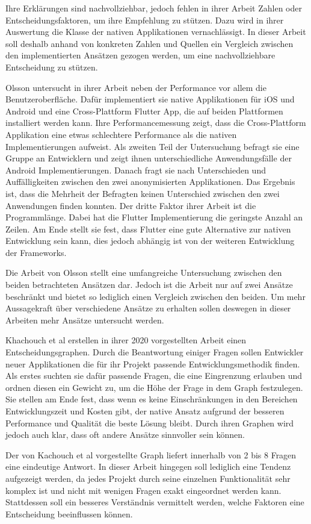 Ihre Erklärungen sind nachvollziehbar, jedoch fehlen in ihrer Arbeit Zahlen oder Entscheidungsfaktoren, um ihre Empfehlung zu stützen. Dazu wird in ihrer Auswertung die Klasse der nativen Applikationen vernachlässigt. In dieser Arbeit soll deshalb anhand von konkreten Zahlen und Quellen ein Vergleich zwischen den implementierten Ansätzen gezogen werden, um eine nachvollziehbare Entscheidung zu stützen.

Olsson \cite{Olsson_2020} untersucht in ihrer Arbeit neben der Performance vor allem die Benutzeroberfläche. Dafür implementiert sie native Applikationen für iOS und Android und eine Cross-Plattform Flutter App, die auf beiden Plattformen installiert werden kann. Ihre Performancemessung zeigt, dass die Cross-Plattform Applikation eine etwas schlechtere Performance als die nativen Implementierungen aufweist. Als zweiten Teil der Untersuchung befragt sie eine Gruppe an Entwicklern und zeigt ihnen unterschiedliche Anwendungsfälle der Android Implementierungen. Danach fragt sie nach Unterschieden und Auffälligkeiten zwischen den zwei anonymisierten Applikationen. Das Ergebnis ist, dass die Mehrheit der Befragten keinen Unterschied zwischen den zwei Anwendungen finden konnten. Der dritte Faktor ihrer Arbeit ist die Programmlänge. Dabei hat die Flutter Implementierung die geringste Anzahl an Zeilen. Am Ende stellt sie fest, dass Flutter eine gute Alternative zur nativen Entwicklung sein kann, dies jedoch abhängig ist von der weiteren Entwicklung der Frameworks.

Die Arbeit von Olsson \cite{Olsson_2020} stellt eine umfangreiche Untersuchung zwischen den beiden betrachteten Ansätzen dar. Jedoch ist die Arbeit nur auf zwei Ansätze beschränkt und bietet so lediglich einen Vergleich zwischen den beiden. Um mehr Aussagekraft über verschiedene Ansätze zu erhalten sollen deswegen in dieser Arbeiten mehr Ansätze untersucht werden. 

Khachouch et al \cite{IEEE_Khackouch_Al} erstellen in ihrer 2020 vorgestellten Arbeit einen Entscheidungsgraphen. Durch die Beantwortung einiger Fragen sollen Entwickler neuer Applikationen die für ihr Projekt passende Entwicklungsmethodik finden. Als erstes suchten sie dafür passende Fragen, die eine Eingrenzung erlauben und ordnen diesen ein Gewicht zu, um die Höhe der Frage in dem Graph festzulegen. Sie stellen am Ende fest, dass wenn es keine Einschränkungen in den Bereichen Entwicklungszeit und Kosten gibt, der native Ansatz aufgrund der besseren Performance und Qualität die beste Lösung bleibt. Durch ihren Graphen wird jedoch auch klar, dass oft andere Ansätze sinnvoller sein können.

Der von Kachouch et al \cite{IEEE_Khackouch_Al} vorgestellte Graph liefert innerhalb von 2 bis 8 Fragen eine eindeutige Antwort. In dieser Arbeit hingegen soll lediglich eine Tendenz aufgezeigt werden, da jedes Projekt durch seine einzelnen Funktionalität sehr komplex ist und nicht mit wenigen Fragen exakt eingeordnet werden kann. Stattdessen soll ein besseres Verständnis vermittelt werden, welche Faktoren eine Entscheidung beeinflussen können. 